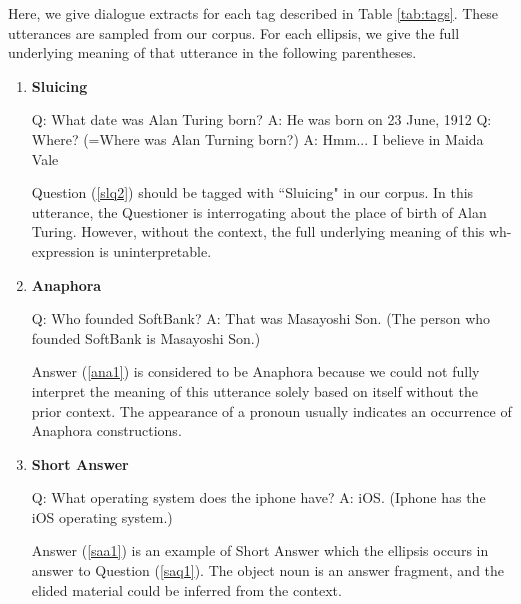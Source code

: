 \documentclass[bsc,frontabs,twoside,singlespacing,parskip,deptreport]{infthesis}     %
\begin{document}
Here, we give dialogue extracts for each tag described in Table \ref{tab:tags}. These utterances are sampled from our corpus. For each ellipsis, we give the full underlying meaning of that utterance in the following parentheses.

\begin{enumerate}
   \item \textbf{Sluicing}
   
\begin{exe}
	\ex
		\begin{xlist}
			\ex \label{slq1} Q: What date was Alan Turing born?
			\ex \label{sla1} A: He was born on 23 June, 1912
			\ex \label{slq2} Q: Where? (=Where was Alan Turning born?)
			\ex \label{sla2} A: Hmm... I believe in Maida Vale
\end{xlist}
\end{exe}

Question (\ref{slq2}) should be tagged with ``Sluicing" in our corpus. In this utterance, the Questioner is interrogating about the place of birth of Alan Turing. However, without the context, the full underlying meaning of this wh-expression is uninterpretable.

\item \textbf{Anaphora}

\begin{exe}
	\ex
		\begin{xlist}
			\ex \label{anq1} Q: Who founded SoftBank?
			\ex \label{ana1} A: That was Masayoshi Son. (The person who founded SoftBank is Masayoshi Son.)
\end{xlist}
\end{exe}

Answer (\ref{ana1}) is considered to be Anaphora because we could not fully interpret the meaning of this utterance solely based on itself without the prior context. The appearance of a pronoun usually indicates an occurrence of Anaphora constructions.

\item \textbf{Short Answer}

\begin{exe}
	\ex
		\begin{xlist}
			\ex \label{saq1} Q: What operating system does the iphone have?
			\ex \label{saa1} A: iOS. (Iphone has the iOS operating system.)
\end{xlist}
\end{exe}

Answer (\ref{saa1}) is an example of Short Answer which the ellipsis occurs in answer to Question (\ref{saq1}). The object noun is an answer fragment, and the elided material could be inferred from the context.




\end{enumerate}
\end{document}
